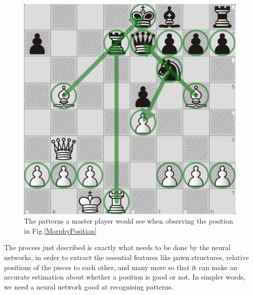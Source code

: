 \begin{figure}[H]
    \centering
    \includegraphics[scale=0.45]{images/MorphyAnotated.png}
    \caption{The patterns a master player would see when observing the position in Fig.\ref{MorphyPosition}}
    \label{MorphyAnotated}
\end{figure}

The process just described is exactly what needs to be done by the neural networks, in order to extract the essential features like pawn structures, relative positions of the pieces to each other, and many more so that it can make an accurate estimation about whether a position is good or not. In simpler words, we need a neural network good at recognising patterns.

